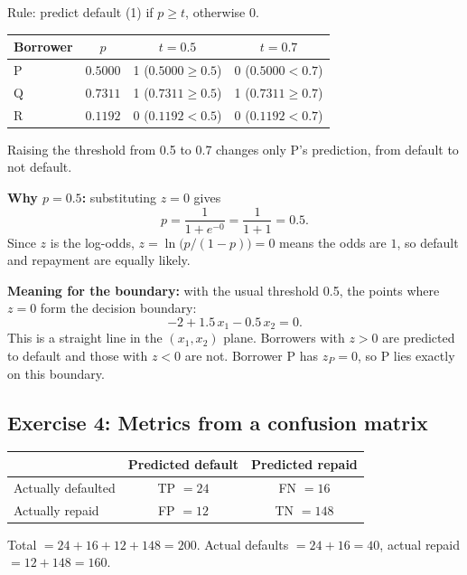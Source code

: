 Rule: predict default (1) if $p \geq t$, otherwise 0.

\begin{table}[H]\centering\small
\begin{tabular}{lccc}\toprule
Borrower & $p$ & $t = 0.5$ & $t = 0.7$\\\midrule
P & $0.5000$ & 1 \quad ($0.5000 \geq 0.5$) & 0 \quad ($0.5000 < 0.7$)\\
Q & $0.7311$ & 1 \quad ($0.7311 \geq 0.5$) & 1 \quad ($0.7311 \geq 0.7$)\\
R & $0.1192$ & 0 \quad ($0.1192 < 0.5$)    & 0 \quad ($0.1192 < 0.7$)\\\bottomrule
\end{tabular}\end{table}

Raising the threshold from 0.5 to 0.7 changes only P's prediction, from default to not default.

\textbf{Why $p = 0.5$:} substituting $z = 0$ gives
\[
  p = \frac{1}{1+e^{-0}} = \frac{1}{1+1} = 0.5 .
\]
Since $z$ is the log-odds, $z = \ln\!\big(p/(1-p)\big) = 0$ means the odds are $1$, so default
and repayment are equally likely.

\textbf{Meaning for the boundary:} with the usual threshold 0.5, the points where $z = 0$ form
the decision boundary:
\[
  -2 + 1.5\,x_1 - 0.5\,x_2 = 0 .
\]
This is a straight line in the $(x_1, x_2)$ plane. Borrowers with $z > 0$ are predicted to
default and those with $z < 0$ are not. Borrower P has $z_P = 0$, so P lies exactly on this
boundary.

\subsection{Exercise 4: Metrics from a confusion matrix}
\begin{table}[H]\centering\small
\begin{tabular}{lcc}\toprule
 & Predicted default & Predicted repaid\\\midrule
Actually defaulted & TP $=24$ & FN $=16$\\
Actually repaid    & FP $=12$ & TN $=148$\\\bottomrule
\end{tabular}\end{table}
Total $= 24 + 16 + 12 + 148 = 200$. Actual defaults $= 24 + 16 = 40$, actual repaid $= 12 + 148 = 160$.


